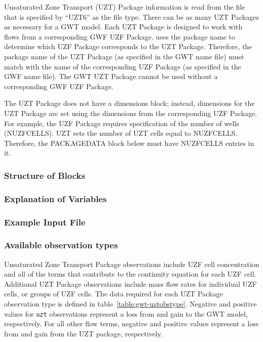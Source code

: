 Unsaturated Zone Transport (UZT) Package information is read from the file that is specified by ``UZT6'' as the file type.  There can be as many UZT Packages as necessary for a GWT model. Each UZT Package is designed to work with flows from a corresponding GWF UZF Package. \mf uses the package name to determine which UZF Package corresponds to the UZT Package.  Therefore, the package name of the UZT Package (as specified in the GWT name file) must match with the name of the corresponding UZF Package (as specified in the GWF name file).  The GWT UZT Package cannot be used without a corresponding GWF UZF Package.

The UZT Package does not have a dimensions block; instead, dimensions for the UZT Package are set using the dimensions from the corresponding UZF Package.  For example, the UZF Package requires specification of the number of wells (NUZFCELLS).  UZT sets the number of UZT cells equal to NUZFCELLS.  Therefore, the PACKAGEDATA block below must have NUZFCELLS entries in it.

\vspace{5mm}
\subsubsection{Structure of Blocks}




\vspace{5mm}
\subsubsection{Explanation of Variables}
\begin{description}

\end{description}

\vspace{5mm}
\subsubsection{Example Input File}


\vspace{5mm}
\subsubsection{Available observation types}
Unsaturated Zone Transport Package observations include UZF cell concentration and all of the terms that contribute to the continuity equation for each UZF cell. Additional UZT Package observations include mass flow rates for individual UZF cells, or groups of UZF cells. The data required for each UZT Package observation type is defined in table~\ref{table:gwt-uztobstype}. Negative and positive values for \texttt{uzt} observations represent a loss from and gain to the GWT model, respectively. For all other flow terms, negative and positive values represent a loss from and gain from the UZT package, respectively.

